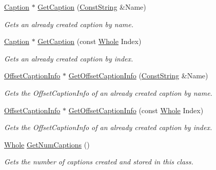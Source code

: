 \begin{DoxyCompactItemize}
\hyperlink{classphys_1_1UI_1_1Caption}{Caption} $\ast$ \hyperlink{classphys_1_1UI_1_1Window_acfc2669ecac2824bfa7cc53eb724d191}{GetCaption} (\hyperlink{namespacephys_a5ce5049f8b4bf88d6413c47b504ebb31}{ConstString} \&Name)
\begin{DoxyCompactList}\small\item\em Gets an already created caption by name. \item\end{DoxyCompactList}\item 
\hyperlink{classphys_1_1UI_1_1Caption}{Caption} $\ast$ \hyperlink{classphys_1_1UI_1_1Window_acfd87d8fa929b8a25d968f04d3e05aca}{GetCaption} (const \hyperlink{namespacephys_a460f6bc24c8dd347b05e0366ae34f34a}{Whole} Index)
\begin{DoxyCompactList}\small\item\em Gets an already created caption by index. \item\end{DoxyCompactList}\item 
\hyperlink{structphys_1_1UI_1_1ResizingInfo}{OffsetCaptionInfo} $\ast$ \hyperlink{classphys_1_1UI_1_1Window_afa081532c017f5e8c4f04bfd2df207b6}{GetOffsetCaptionInfo} (\hyperlink{namespacephys_a5ce5049f8b4bf88d6413c47b504ebb31}{ConstString} \&Name)
\begin{DoxyCompactList}\small\item\em Gets the OffsetCaptionInfo of an already created caption by name. \item\end{DoxyCompactList}\item 
\hyperlink{structphys_1_1UI_1_1ResizingInfo}{OffsetCaptionInfo} $\ast$ \hyperlink{classphys_1_1UI_1_1Window_aaef954a5d93c48ae09f891d737019f75}{GetOffsetCaptionInfo} (const \hyperlink{namespacephys_a460f6bc24c8dd347b05e0366ae34f34a}{Whole} Index)
\begin{DoxyCompactList}\small\item\em Gets the OffsetCaptionInfo of an already created caption by index. \item\end{DoxyCompactList}\item 
\hyperlink{namespacephys_a460f6bc24c8dd347b05e0366ae34f34a}{Whole} \hyperlink{classphys_1_1UI_1_1Window_a125d78e98b47a4d93f6414545fd2374c}{GetNumCaptions} ()
\begin{DoxyCompactList}\small\item\em Gets the number of captions created and stored in this class. \item\end{DoxyCompactList}\item 

\end{DoxyCompactItemize}
